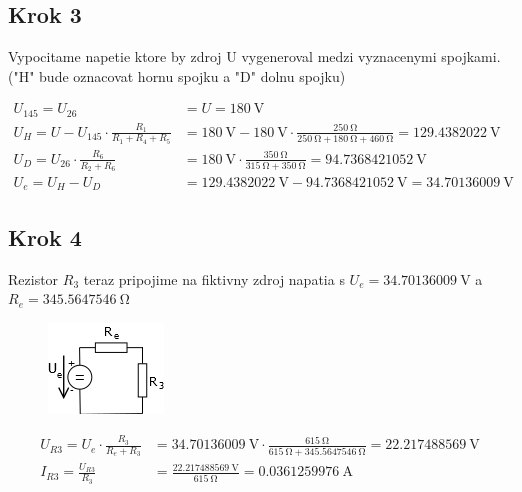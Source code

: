 \subsection{Krok 3}
Vypocitame napetie ktore by zdroj U vygeneroval medzi vyznacenymi spojkami. ("H" bude oznacovat hornu spojku a "D" dolnu spojku) 

\begin{align*}
    U_{145} = U_{26} &= U = \SI{180}{\volt}\\
    U_H =  U - U_{145} \cdot \frac{R_1}{R_1 + R_4 + R_5} &= \SI{180}{\volt} - \SI{180}{\volt} 
    \cdot \frac{\SI{250}{\ohm}}{\SI{250}{\ohm} + \SI{180}{\ohm} + \SI{460}{\ohm}} = \SI{129.4382022}{\volt}\\
    U_D =  U_{26} \cdot \frac{R_6}{R_2 + R_6} &= \SI{180}{\volt} \cdot \frac{\SI{350}{\ohm}}{\SI{315}{\ohm} + \SI{350}{\ohm}} = \SI{94.7368421052}{\volt}\\
    U_e = U_H - U_D &= \SI{129.4382022}{\volt} - \SI{94.7368421052}{\volt} =  \SI{34.70136009}{\volt}
\end{align*}

\subsection{Krok 4}
Rezistor $R_3$ teraz pripojime na fiktivny zdroj napatia s $U_e = \SI{34.70136009}{\volt}$ a $R_e = \SI{345.5647546}{\ohm}$

\begin{figure}[!h]
    \centering
    \includegraphics[width=0.2\linewidth]{pr2/3.png}
\end{figure}

\begin{align*}
    U_{R3} = U_e \cdot \frac{R_3}{R_e + R_3} &= \SI{34.70136009}{\volt} \cdot \frac{\SI{615}{\ohm}}{\SI{615}{\ohm} + \SI{345.5647546}{\ohm}} = \SI{22.217488569}{\volt}\\
    I_{R3} = \frac{U_{R3}}{R_3} &= \frac{\SI{22.217488569}{\volt}}{\SI{615}{\ohm}} = \SI{0.0361259976}{\ampere}
\end{align*}